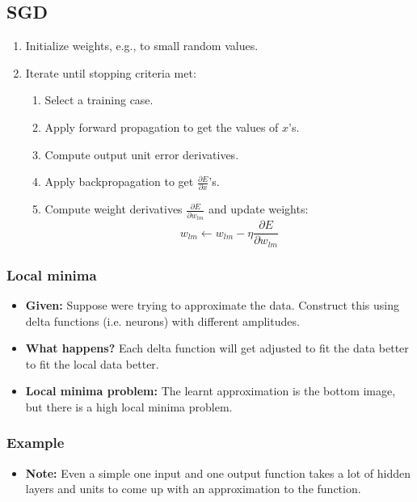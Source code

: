 \subsection{SGD}
\begin{definition}
    \begin{enumerate}
        \item Initialize weights, e.g., to small random values.
        \item Iterate until stopping criteria met:
        \begin{enumerate}
            \item Select a training case.
            \item Apply forward propagation to get the values of \( x \)'s.
            \item Compute output unit error derivatives.
            \item Apply backpropagation to get \( \frac{\partial E}{\partial x} \)'s.
            \item Compute weight derivatives \( \frac{\partial E}{\partial w_{lm}} \) and update weights:
            \[
            w_{lm} \leftarrow w_{lm} - \eta \frac{\partial E}{\partial w_{lm}}
            \]
        \end{enumerate}
    \end{enumerate}
\end{definition}

\subsubsection{Local minima}
\begin{example}
    \begin{itemize}
        \item \textbf{Given:} Suppose were trying to approximate the data. Construct this using delta functions (i.e. neurons) with different amplitudes. 
        \item \textbf{What happens?} Each delta function will get adjusted to fit the data better to fit the local data better. 
        \item \textbf{Local minima problem:} The learnt approximation is the bottom image, but there is a high local minima problem. 
    \end{itemize}
\end{example}

\subsubsection{Example}
\begin{example}
    \begin{itemize}
        \item \textbf{Note:} Even a simple one input and one output function takes a lot of hidden layers and units to come up with an approximation to the function. 
    \end{itemize}
\end{example}

